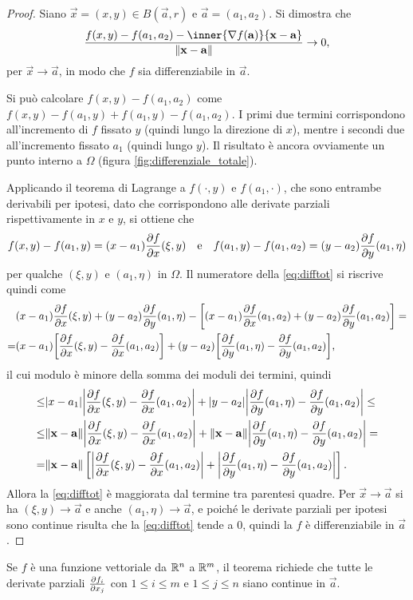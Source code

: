 \begin{proof}
	Siano $\vec x=(x,y)\in B(\vec a,r)$ e $\vec a=(a_1,a_2)$.
	Si dimostra che
	\begin{equation} \label{eq:difftot}
		\frac{f(x,y)-f(a_1,a_2)-\inner{\grad f(\vec a)}{\vec x-\vec a}}{\norm{\vec x-\vec a}}\to 0,
	\end{equation}
	per $\vec x\to\vec a$, in modo che $f$ sia differenziabile in $\vec a$.

	Si può calcolare $f(x,y)-f(a_1,a_2)$ come $f(x,y)-f(a_1,y)+f(a_1,y)-f(a_1,a_2)$.
	I primi due termini corrispondono all'incremento di $f$ fissato $y$ (quindi lungo la direzione di $x$), mentre i secondi due all'incremento fissato $a_1$ (quindi lungo $y$).
	Il risultato è ancora ovviamente un punto interno a $\Omega$ (figura \ref{fig:differenziale_totale}).
	
	Applicando il teorema di Lagrange a $f(\cdot,y)$ e $f(a_1,\cdot)$, che sono entrambe derivabili per ipotesi, dato che corrispondono alle derivate parziali rispettivamente in $x$ e $y$, si ottiene che
	\begin{equation}
		f(x,y)-f(a_1,y)=(x-a_1)\drp{f}{x}(\xi,y)\qtext{e} f(a_1,y)-f(a_1,a_2)=(y-a_2)\drp{f}{y}(a_1,\eta)
	\end{equation}
	per qualche $(\xi,y)$ e $(a_1,\eta)$ in $\Omega$.
	Il numeratore della \eqref{eq:difftot} si riscrive quindi come
	\begin{align*}
		&(x-a_1)\drp{f}{x}(\xi,y)+(y-a_2)\drp{f}{y}(a_1,\eta)-\bigg[(x-a_1)\drp{f}{x}(a_1,a_2)+(y-a_2)\drp{f}{y}(a_1,a_2)\bigg]=\\
		=&(x-a_1)\bigg[\drp{f}{x}(\xi,y)-\drp{f}{x}(a_1,a_2)\bigg]+(y-a_2)\bigg[\drp{f}{y}(a_1,\eta)-\drp{f}{y}(a_1,a_2)\bigg],
	\end{align*}
	il cui modulo è minore della somma dei moduli dei termini, quindi
	\begin{align*}
		\leq&\abs{x-a_1}\abs[\bigg]{\drp{f}{x}(\xi,y)-\drp{f}{x}(a_1,a_2)}+\abs{y-a_2}\abs[\bigg]{\drp{f}{y}(a_1,\eta)-\drp{f}{y}(a_1,a_2)}\leq\\
		\leq&\norm{\vec x-\vec a}\abs[\bigg]{\drp{f}{x}(\xi,y)-\drp{f}{x}(a_1,a_2)}+\norm{\vec x-\vec a}\abs[\bigg]{\drp{f}{y}(a_1,\eta)-\drp{f}{y}(a_1,a_2)}=\\
		=&\norm{\vec x-\vec a}\left[\abs[\bigg]{\drp{f}{x}(\xi,y)-\drp{f}{x}(a_1,a_2)}+\abs[\bigg]{\drp{f}{y}(a_1,\eta)-\drp{f}{y}(a_1,a_2)}\right].
	\end{align*}
	Allora la \eqref{eq:difftot} è maggiorata dal termine tra parentesi quadre.
	Per $\vec x\to\vec a$ si ha $(\xi,y)\to\vec a$ e anche $(a_1,\eta)\to\vec a$, e poiché le derivate parziali per ipotesi sono continue risulta che la \eqref{eq:difftot} tende a 0, quindi la $f$ è differenziabile in $\vec a$.
\end{proof}
Se $f$ è una funzione vettoriale da $\R^n$ a $\R^m$, il teorema richiede che tutte le derivate parziali $\drp{f_i}{x_j}$ con $1\leq i\leq m$ e $1\leq j\leq n$ siano continue in $\vec a$.

